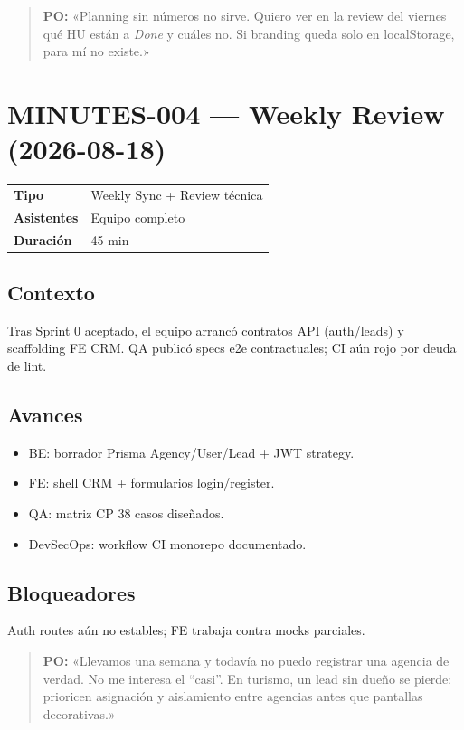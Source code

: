 \documentclass[11pt,a4paper]{article}
\begin{document}
\begin{quote}
\textcolor{po}{\textbf{PO:} «Planning sin números no sirve. Quiero ver en la review del viernes qué HU están a \emph{Done} y cuáles no. Si branding queda solo en localStorage, para mí no existe.»}
\end{quote}

\section{MINUTES-004 — Weekly Review (2026-08-18)}
\begin{tabular}{@{}ll@{}}
\textbf{Tipo} & Weekly Sync + Review técnica \\
\textbf{Asistentes} & Equipo completo \\
\textbf{Duración} & 45 min \\
\end{tabular}

\subsection*{Contexto}
Tras Sprint 0 aceptado, el equipo arrancó contratos API (auth/leads) y scaffolding FE CRM.
QA publicó specs e2e contractuales; CI aún rojo por deuda de lint.

\subsection*{Avances}
\begin{itemize}[leftmargin=*]
  \item BE: borrador Prisma Agency/User/Lead + JWT strategy.
  \item FE: shell CRM + formularios login/register.
  \item QA: matriz CP 38 casos diseñados.
  \item DevSecOps: workflow CI monorepo documentado.
\end{itemize}

\subsection*{Bloqueadores}
Auth routes aún no estables; FE trabaja contra mocks parciales.

\begin{quote}
\textcolor{po}{\textbf{PO:} «Llevamos una semana y todavía no puedo registrar una agencia de verdad. No me interesa el “casi”. En turismo, un lead sin dueño se pierde: prioricen asignación y aislamiento entre agencias antes que pantallas decorativas.»}
\end{quote}
\end{document}
